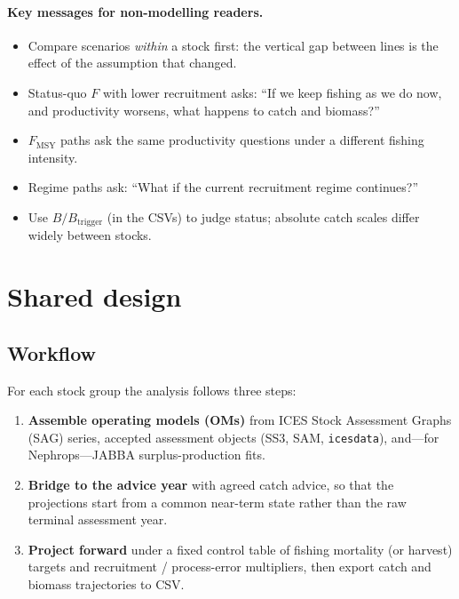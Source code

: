 \paragraph{Key messages for non-modelling readers.}
\begin{itemize}
  \item Compare scenarios \emph{within} a stock first: the vertical gap between
        lines is the effect of the assumption that changed.
  \item Status-quo $F$ with lower recruitment asks: ``If we keep fishing as we
        do now, and productivity worsens, what happens to catch and biomass?''
  \item $F_{\mathrm{MSY}}$ paths ask the same productivity questions under a
        different fishing intensity.
  \item Regime paths ask: ``What if the current recruitment regime continues?''
  \item Use $B/B_{\mathrm{trigger}}$ (in the CSVs) to judge status; absolute
        catch scales differ widely between stocks.
\end{itemize}

\section{Shared design}
\label{sec:tac-design}

\subsection{Workflow}
\label{sec:tac-workflow}

For each stock group the analysis follows three steps:

\begin{enumerate}
  \item \textbf{Assemble operating models (OMs)} from ICES Stock Assessment
        Graphs (SAG) series, accepted assessment objects (SS3, SAM,
        \texttt{icesdata}), and---for Nephrops---JABBA surplus-production fits.
  \item \textbf{Bridge to the advice year} with agreed catch advice, so that
        the projections start from a common near-term state rather than the
        raw terminal assessment year.
  \item \textbf{Project forward} under a fixed control table of fishing
        mortality (or harvest) targets and recruitment / process-error
        multipliers, then export catch and biomass trajectories to CSV.
\end{enumerate}

